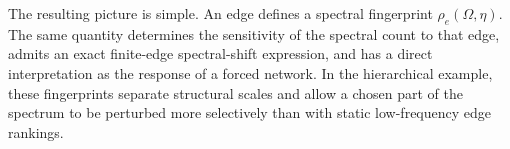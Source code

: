 \documentclass[11pt,reqno]{amsart}
\begin{document}
The resulting picture is simple. An edge defines a spectral fingerprint $\rho_e(\Omega,\eta)$. The same quantity determines the sensitivity of the spectral count to that edge, admits an exact finite-edge spectral-shift expression, and has a direct interpretation as the response of a forced network. In the hierarchical example, these fingerprints separate structural scales and allow a chosen part of the spectrum to be perturbed more selectively than with static low-frequency edge rankings.



\end{document}
